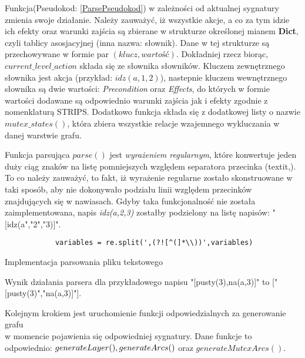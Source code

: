     Funkcja(Pseudokod: \ref{ParsePseudokod}) w zależności od aktualnej sygnatury zmienia swoje działanie. Należy zauważyć, iż wszystkie akcje, a co za tym idzie ich efekty oraz 
    warunki zajścia są zbierane w strukturze określonej mianem \textbf{Dict}, czyli tablicy asosjacyjnej (inna nazwa: słownik). 
    Dane w tej strukturze są przechowywane w formie par $(klucz,wartość)$. Dokładniej rzecz biorąc, $current\_level\_action$ składa się ze słownika 
    słowników. Kluczem zewnętrznego słownika jest akcja (przykład: $idz(a,1,2)$), nastepnie kluczem wewnętrznego słownika są dwie wartości: 
    \textit{Precondition} oraz \textit{Effects}, do których w formie wartości dodawane są odpowiednio warunki zajścia jak i efekty zgodnie 
    z nomenklaturą STRIPS.
    Dodatkowo funkcja składa się z dodatkowej listy o nazwie $mutex\_states()$, która zbiera wszystkie relacje wzajemnego wykluczania w 
    danej warstwie grafu. 

    Funkcja parsująca $parse()$ jest \textit{wyrażeniem regularnym}, które konwertuje jeden duży ciąg znaków na listę pomniejszych względem 
    separatora przecinka (textit{,}). To co należy zauważyć, to fakt, iż wyrażenie regularne zostało skonstruowane w taki sposób, aby nie 
    dokonywało podziału linii względem przecinków znajdujących się w nawiasach. Gdyby taka funkcjonalność nie została zaimplementowana, napis 
    \textit{idz(a,2,3)} zostałby podzielony na listę napisów: "[idz(a","2","3)]". 

    \begin{listing}[H]
        \begin{verbatim}
            variables = re.split(',(?![^(]*\\))',variables)
        \end{verbatim}
    \caption{Implementacja parsowania pliku tekstowego}
    \label{REGEX}
    \end{listing}
    Wynik działania parsera dla przykładowego napisu "[pusty(3),na(a,3)]" to ["[pusty(3)","na(a,3)]"].

    Kolejnym krokiem jest uruchomienie funkcji odpowiedzialnych za generowanie grafu \\
    w momencie pojawienia się odpowiedniej sygnatury. 
    Dane funkcje to odpowiednio: $generateLayer(),  \\ 
    generateArcs()$ oraz $generateMutexArcs()$.

